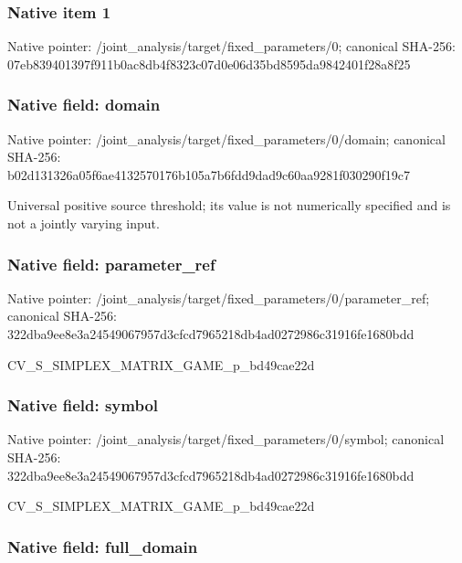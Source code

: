 \documentclass[10pt,a4paper]{article}
\begin{document}
\subsubsection{Native item 1}


Native pointer: /joint\_analysis/target/f\allowbreak{}ixed\_parameters/0; canonical SHA-256: 07eb839401397f911b0ac8db\allowbreak{}4f8323c07d0e06d35bd8595d\allowbreak{}a9842401f28a8f25



\subsubsection{Native field: domain}


Native pointer: /joint\_analysis/target/f\allowbreak{}ixed\_parameters/0/domain; canonical SHA-256: b02d131326a05f6ae4132570\allowbreak{}176b105a7b6fdd9dad9c60aa\allowbreak{}9281f030290f19c7


Universal positive source threshold; its value is not numerically specified and is not a jointly varying input.


\subsubsection{Native field: parameter\_ref}


Native pointer: /joint\_analysis/target/f\allowbreak{}ixed\_parameters/0/parame\allowbreak{}ter\_ref; canonical SHA-256: 322dba9ee8e3a24549067957\allowbreak{}d3cfcd7965218db4ad027298\allowbreak{}6c31916fe1680bdd


CV\_S\_SIMPLEX\_MATRIX\_GAME\_p\_bd49cae22d


\subsubsection{Native field: symbol}


Native pointer: /joint\_analysis/target/f\allowbreak{}ixed\_parameters/0/symbol; canonical SHA-256: 322dba9ee8e3a24549067957\allowbreak{}d3cfcd7965218db4ad027298\allowbreak{}6c31916fe1680bdd


CV\_S\_SIMPLEX\_MATRIX\_GAME\_p\_bd49cae22d


\subsubsection{Native field: full\_domain}
\end{document}
